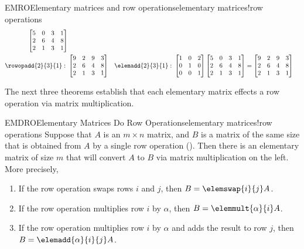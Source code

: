 \begin{example}{EMRO}{Elementary matrices and row operations}{elementary matrices!row operations}
\begin{align*}
\begin{bmatrix}
5 & 0 & 3 & 1\\
2 & 6 & 4 & 8\\
2 & 1 & 3 & 1
\end{bmatrix}\\
%
%
\rowopadd{2}{3}{1}:\ &
\begin{bmatrix}
9 & 2 & 9 & 3\\
2 & 6 & 4 & 8\\
2 & 1 & 3 & 1
\end{bmatrix}
&
\elemadd{2}{3}{1}:\ &
\begin{bmatrix}
1 & 0 & 2\\
0 & 1 & 0\\
0 & 0 & 1
\end{bmatrix}
\begin{bmatrix}
5 & 0 & 3 & 1\\
2 & 6 & 4 & 8\\
2 & 1 & 3 & 1
\end{bmatrix}
=
\begin{bmatrix}
9 & 2 & 9 & 3\\
2 & 6 & 4 & 8\\
2 & 1 & 3 & 1
\end{bmatrix}
%
%
\end{align*}
%
\end{example}
%
The next three theorems establish that each elementary matrix effects a row operation via matrix multiplication.
%
\begin{theorem}{EMDRO}{Elementary Matrices Do Row Operations}{elementary matrices!row operations}
Suppose that $A$ is an $m\times n$ matrix, and $B$ is a matrix of the same size that is obtained from $A$ by a single row operation ().  Then there is an elementary matrix of size $m$ that will convert $A$ to $B$ via matrix multiplication on the left.  More precisely,
\begin{enumerate}
\item  If the row operation swaps rows $i$ and $j$, 
then $B=\elemswap{i}{j}A$.
\item  If the row operation multiplies row $i$ by $\alpha$, 
then $B=\elemmult{\alpha}{i}A$.
\item  If the row operation multiplies row $i$ by $\alpha$ and adds the result to row $j$, 
then $B=\elemadd{\alpha}{i}{j}A$.
\end{enumerate}
\end{theorem}
%
